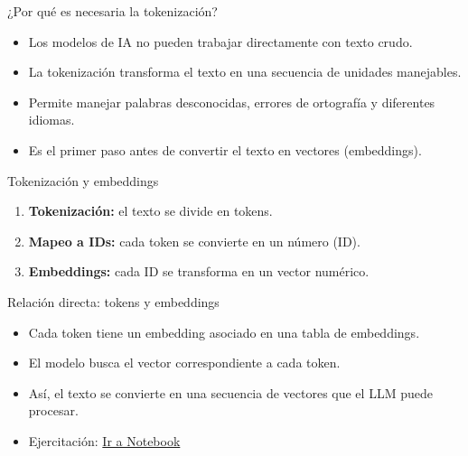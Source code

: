\documentclass[aspectratio=169,xcolor=dvipsnames, t]{beamer}
\begin{document}
\begin{frame}{¿Por qué es necesaria la tokenización?}
    \begin{itemize}
        \item Los modelos de IA no pueden trabajar directamente con texto crudo.
        \item La tokenización transforma el texto en una secuencia de unidades manejables.
        \item Permite manejar palabras desconocidas, errores de ortografía y diferentes idiomas.
        \item Es el primer paso antes de convertir el texto en vectores (embeddings).
    \end{itemize}
\end{frame}

\begin{frame}{Tokenización y embeddings}
    \begin{enumerate}
        \item \textbf{Tokenización:} el texto se divide en tokens.
        \item \textbf{Mapeo a IDs:} cada token se convierte en un número (ID).
        \item \textbf{Embeddings:} cada ID se transforma en un vector numérico.
    \end{enumerate}
    \vspace{0.3cm}

\end{frame}



\begin{frame}{Relación directa: tokens y embeddings}
    \begin{itemize}
        \item Cada token tiene un embedding asociado en una tabla de embeddings.
        \item El modelo busca el vector correspondiente a cada token.
        \item Así, el texto se convierte en una secuencia de vectores que el LLM puede procesar.
        \item Ejercitación: \href{https://colab.research.google.com/drive/1LL-4FD0pkpl4zpbWYREUuspsDYNg0P3u\#scrollTo=0TRVc0xrzRWW}{Ir a Notebook}

    \end{itemize}
    \vspace{0.3cm}

\end{frame}
\end{document}
